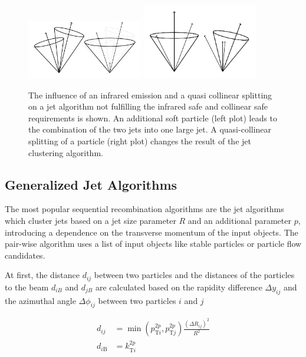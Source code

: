 \begin{figure}[htb]
    \centering
    \includegraphics[width=0.45\textwidth]{figures/drawings/infrared_safety/jetinfrared.pdf}\hfill
    \includegraphics[width=0.45\textwidth]{figures/drawings/infrared_safety/jetcollinear.pdf}
    \caption[Effect of infrared emissions and collinear splittings on jet
    algorithms]{The influence of an infrared emission and a quasi
        collinear splitting on a jet algorithm not fulfilling the infrared safe
        and collinear safe requirements is shown. An additional soft particle (left plot)
    leads to the combination of the two jets into one large jet. A
quasi-collinear splitting of a particle (right plot) changes the result of the
jet clustering algorithm.}
    \label{fig:infrared_safety}
\end{figure}

\subsection{Generalized \kt Jet Algorithms}

The most popular sequential recombination algorithms are the \kt jet
algorithms which cluster jets based on a jet size parameter $R$ and an
additional parameter $p$, introducing a dependence on the transverse momentum of
the input objects. The pair-wise algorithm uses a list of input objects like stable
particles or particle flow candidates. 

At first, the distance $d_{ij}$ between two particles and the distances of the
particles to the beam $d_{iB}$ and $d_{jB}$ are calculated based on the rapidity
difference $\Delta y_{ij}$ and the azimuthal angle $\Delta \phi_{ij}$ between two
particles $i$ and $j$

\begin{align*} 
    d_{ij} &= \min(p_{\mathrm{T}i}^{2p},p_{\mathrm{T}j}^{2p})\frac{\left(\Delta
        R_{ij}\right)^2}{R^2}\\
    d_{i\mathrm{B}} &= k_{\mathrm{T}i}^{2p}
\end{align*} 

